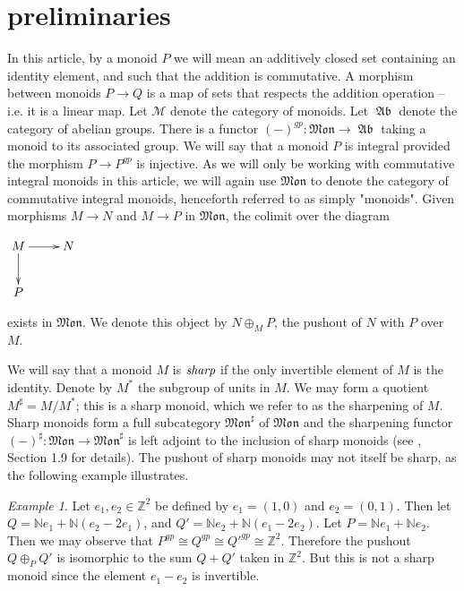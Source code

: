 \documentclass[12pt]{amsart}
\numberwithin{equation}{section}
\theoremstyle{plain}
\theoremstyle{remark}
\newtheorem{exm}[equation]{Example}
\DeclareMathOperator{\Ab}{\mathfrak{Ab}}
\newcommand{\Z}{\mathbb Z}
\newcommand{\NN}{\mathbb N}
\newcommand{\Mon}{\mathfrak{Mon}}
\newcommand{\calM}{\mathcal{M}}
\begin{document}
\section{preliminaries}\label{Prelim}
In this article, by a monoid $P$ we will mean an additively closed set containing an identity element, and such that the addition is commutative. A morphism between monoids $P\to Q$ is a map of sets that respects the addition operation -- i.e. it is a linear map. Let $\calM$ denote the category of monoids. Let $\Ab$ denote the category of abelian groups. There is a functor $(-)^{gp}:\Mon\to \Ab$ taking a monoid to its associated group. We will say that a monoid $P$ is integral provided the morphism $P\to P^{gp}$ is injective. As we will only be working with commutative integral monoids in this article, we will again use $\Mon$ to denote the category of commutative integral monoids, henceforth referred to as simply "monoids". Given morphisms $M\to N$ and $M\to P$ in $\Mon$, the colimit over the diagram
\begin{center}
	$\xymatrix{
		M \ar[r] \ar[d]& N\\
		P&
	}$
\end{center}
exists in $\Mon$. We denote this object by $N\oplus_M P$, the pushout of $N$ with $P$ over $M$.

	We will say that a monoid $M$ is $\emph{sharp}$ if the only invertible element of $M$ is the identity. Denote by $M^*$ the subgroup of units in $M$. We may form a quotient $M^{\sharp} = M/M^*$; this is a sharp monoid, which we refer to as the sharpening of $M$. Sharp monoids form a full subcategory $\Mon^{\sharp}$ of $\Mon$ and the sharpening functor $(-)^{\sharp}:\Mon\to\Mon^{\sharp}$ is left adjoint to the inclusion of sharp monoids (see \cite{LogGeo}, Section 1.9 for details). The pushout of sharp monoids may not itself be sharp, as the following example illustrates.
\begin{exm}\label{notSharp}
	Let $e_1,e_2\in\Z^2$ be defined by $e_1 = (1,0)$ and $e_2 = (0,1)$. Then let $Q = \NN e_1 + \NN(e_2 - 2e_1)$, and $Q' = \NN e_2 + \NN (e_1 - 2e_2)$. Let $P = \NN e_1 + \NN e_2$. Then we may observe that $P^{gp}\cong Q^{gp} \cong Q'^{gp} \cong \Z^2$. Therefore the pushout $Q\oplus_P Q'$ is isomorphic to the sum $Q + Q'$ taken in $\Z^2$. But this is not a sharp monoid since the element $e_1 - e_2$ is invertible. 
\end{exm}
\end{document}
